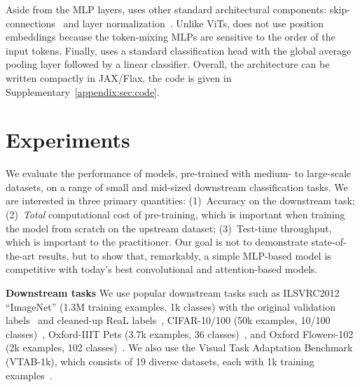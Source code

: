 Aside from the MLP layers, \name{} uses other standard architectural components: skip-con\-nec\-tions~\cite{he2016deep} and layer normalization~\cite{ba2016layer}.
Unlike ViTs, \name{} does not use position embeddings because the token-mixing MLPs are sensitive to the order of the input tokens.
Finally, \name{} uses a standard classification head with the global average pooling layer followed by a linear classifier. 
Overall, the architecture can be written compactly in JAX/Flax, the code is given in Supplementary~\ref{appendix:sec:code}.


\section{Experiments}
\label{sec:experiments}
We evaluate the performance of \fullname{} models, pre-trained with medium- to large-scale datasets,
on a range of small and mid-sized downstream classification tasks.
We are interested in three primary quantities:
(1)~Accuracy on the downstream task;
(2)~\emph{Total} computational cost of pre-training, which is important when training the model from scratch on the upstream dataset;
(3)~Test-time throughput, which is important to the practitioner.
Our goal is not to demonstrate state-of-the-art results, but to show that, remarkably, a simple MLP-based model is competitive with today's best convolutional and attention-based models.

{\bf Downstream tasks\;\;}
We use popular downstream tasks such as ILSVRC2012 ``ImageNet'' (1.3M training examples, 1k classes) with the original validation labels~\citep{deng2009-imagenet} and cleaned-up ReaL labels~\citep{beyer2020-imagenet},
CIFAR-10/100 (50k examples, 10/100 classes)~\citep{Krizhevsky2009-cifar},
Oxford-IIIT Pets (3.7k examples, 36 classes)~\citep{parkhi2012-pets},
and Oxford Flowers-102 (2k examples, 102 classes)~\citep{Nilsback2008-flowers}.
We also use the Visual Task Adaptation Benchmark (VTAB-1k), which consists of 19 diverse datasets, each with 1k training examples~\citep{vtab}.

